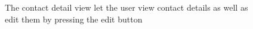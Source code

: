 \documentclass[12pt, a4paper, onecolumn]{article}
\begin{document}
	
	\begin{figure}[H]
		\centering
		\caption{The contact detail view let the user view contact details as well as edit them by pressing the edit button}%
		\label{fig:contacts-detail-screen}%
	\end{figure}
\end{document}
